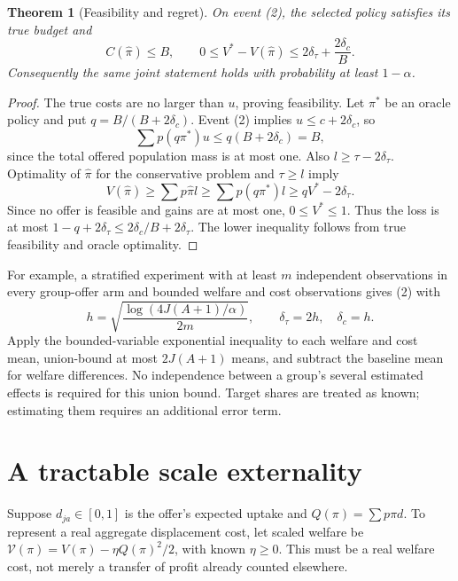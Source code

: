 \documentclass[11pt,a4paper]{article}
\newtheorem{theorem}{Theorem}[section]
\theoremstyle{remark}
\begin{document}
\begin{theorem}[Feasibility and regret]
On event (2), the selected policy satisfies its true budget and
\[
 C(\widehat\pi)\le B,\qquad
 0\le V^*-V(\widehat\pi)
 \le2\delta_\tau+\frac{2\delta_c}{B}.
\]
Consequently the same joint statement holds with probability at least $1-\alpha$.
\end{theorem}
\begin{proof}
The true costs are no larger than $u$, proving feasibility. Let $\pi^*$ be an oracle policy and put $q=B/(B+2\delta_c)$. Event (2) implies $u\le c+2\delta_c$, so
\[
 \sum p(q\pi^*)u\le q(B+2\delta_c)=B,
\]
since the total offered population mass is at most one. Also $l\ge\tau-2\delta_\tau$. Optimality of $\widehat\pi$ for the conservative problem and $\tau\ge l$ imply
\[
 V(\widehat\pi)\ge\sum p\widehat\pi l
 \ge\sum p(q\pi^*)l\ge qV^*-2\delta_\tau.
\]
Since no offer is feasible and gains are at most one, $0\le V^*\le1$. Thus the loss is at most $1-q+2\delta_\tau\le2\delta_c/B+2\delta_\tau$. The lower inequality follows from true feasibility and oracle optimality.
\end{proof}
For example, a stratified experiment with at least $m$ independent observations in every group-offer arm and bounded welfare and cost observations gives (2) with
\[
 h=\sqrt{\frac{\log(4J(A+1)/\alpha)}{2m}},\qquad
 \delta_\tau=2h,\quad\delta_c=h.
\]
Apply the bounded-variable exponential inequality to each welfare and cost mean, union-bound at most $2J(A+1)$ means, and subtract the baseline mean for welfare differences. No independence between a group's several estimated effects is required for this union bound. Target shares are treated as known; estimating them requires an additional error term.

\section{A tractable scale externality}
Suppose $d_{ja}\in[0,1]$ is the offer's expected uptake and $Q(\pi)=\sum p\pi d$. To represent a real aggregate displacement cost, let scaled welfare be
$\mathcal V(\pi)=V(\pi)-\eta Q(\pi)^2/2$, with known $\eta\ge0$. This must be a real welfare cost, not merely a transfer of profit already counted elsewhere.
\end{document}

